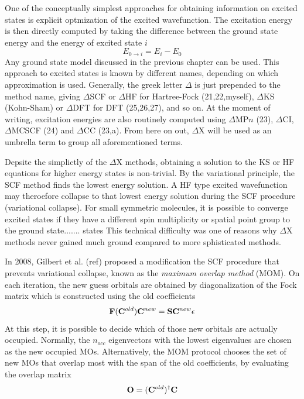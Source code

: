 One of the conceptually simplest approaches for obtaining information on excited states is explicit optmization of the excited wavefunction. The excitation energy is then directly computed by taking the difference between the ground state energy and the energy of excited state $i$
\begin{equation}
E_{0\rightarrow i} = E_i - E_0 
\end{equation} 
\noindent Any ground state model discussed in the previous chapter can be used. This approach to excited states is known by different names, depending on which approximation is used. Generally, the greek letter $\Delta$ is just prepended to the method name, giving $\Delta$SCF or $\Delta$HF for Hartree-Fock (21,22,myself), $\Delta$KS (Kohn-Sham) or $\Delta$DFT for DFT (25,26,27), and so on. At the moment of writing, excitation energies are also routinely computed using $\Delta$MP$n$ (23), $\Delta$CI, $\Delta$MCSCF (24) and $\Delta$CC (23,a). From here on out, $\Delta$X will be used as an umbrella term to group all aforementioned terms. 

Depsite the simplictly of the $\Delta$X methods, obtaining a solution to the KS or HF equations for higher energy states is non-trivial. By the variational principle, the SCF method finds the lowest energy solution. A HF type excited wavefunction may theroefore collapse to that lowest energy solution during the SCF procedure (variational collapse). For small symmetric molecules, it is possible to converge excited states if they have a different spin multiplicity or spatial point group to the ground state....... states This technical difficulty was one of reasons why $\Delta$X methods never gained much ground compared to more sphisticated methods.

In 2008, Gilbert et al. (ref) proposed a modification the SCF procedure that prevents variational collapse, known as the \emph{maximum overlap method} (MOM). On each iteration, the new guess orbitals are obtained by diagonalization of the Fock matrix which is constructed using the old coefficients
\begin{equation}
\mathbf{F}(\mathbf{C}^{old})\mathbf{C}^{new} = \mathbf{S}\mathbf{C}^{new}\epsilon
\end{equation}
\noindent At this step, it is possible to decide which of those new orbitals are actually occupied. Normally, the $n_{occ}$ eigenvectors with the lowest eigenvalues are chosen as the new occupied MOs. Alternatively, the MOM protocol chooses the set of new MOs that overlap most with the span of the old coefficients, by evaluating the overlap matrix
\begin{equation}
\mathbf{O} = (\mathbf{C}^{old})^{\dagger} \mathbf{C}
\end{equation}

